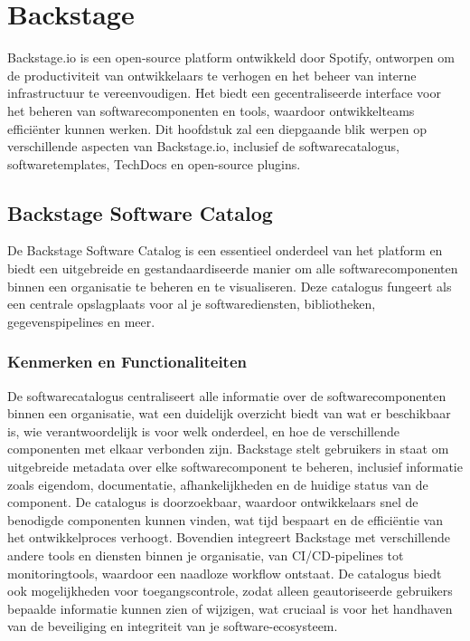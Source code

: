 \chapter{Backstage}
\label{ch:Backstage}

Backstage.io is een open-source platform ontwikkeld door Spotify, ontworpen om de productiviteit van ontwikkelaars te verhogen en het beheer van interne infrastructuur te vereenvoudigen. Het biedt een gecentraliseerde interface voor het beheren van softwarecomponenten en tools, waardoor ontwikkelteams efficiënter kunnen werken. Dit hoofdstuk zal een diepgaande blik werpen op verschillende aspecten van Backstage.io, inclusief de softwarecatalogus, softwaretemplates, TechDocs en open-source plugins.

\section{Backstage Software Catalog}

De Backstage Software Catalog is een essentieel onderdeel van het platform en biedt een uitgebreide en gestandaardiseerde manier om alle softwarecomponenten binnen een organisatie te beheren en te visualiseren. Deze catalogus fungeert als een centrale opslagplaats voor al je softwarediensten, bibliotheken, gegevenspipelines en meer.

\subsection{Kenmerken en Functionaliteiten}

De softwarecatalogus centraliseert alle informatie over de softwarecomponenten binnen een organisatie, wat een duidelijk overzicht biedt van wat er beschikbaar is, wie verantwoordelijk is voor welk onderdeel, en hoe de verschillende componenten met elkaar verbonden zijn. Backstage stelt gebruikers in staat om uitgebreide metadata over elke softwarecomponent te beheren, inclusief informatie zoals eigendom, documentatie, afhankelijkheden en de huidige status van de component. De catalogus is doorzoekbaar, waardoor ontwikkelaars snel de benodigde componenten kunnen vinden, wat tijd bespaart en de efficiëntie van het ontwikkelproces verhoogt. Bovendien integreert Backstage met verschillende andere tools en diensten binnen je organisatie, van CI/CD-pipelines tot monitoringtools, waardoor een naadloze workflow ontstaat. De catalogus biedt ook mogelijkheden voor toegangscontrole, zodat alleen geautoriseerde gebruikers bepaalde informatie kunnen zien of wijzigen, wat cruciaal is voor het handhaven van de beveiliging en integriteit van je software-ecosysteem.


